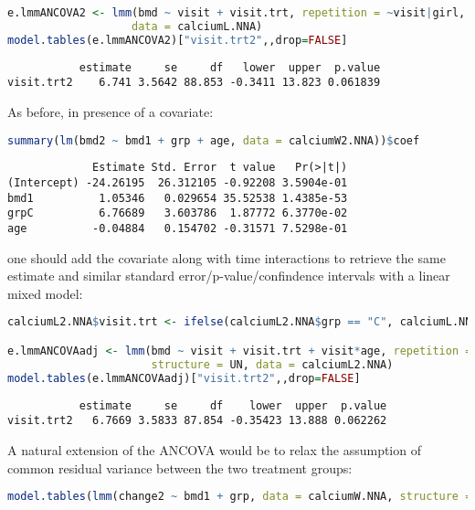 \documentclass[12pt]{article}
\begin{document}
\begin{lstlisting}[language=r,numbers=none]
e.lmmANCOVA2 <- lmm(bmd ~ visit + visit.trt, repetition = ~visit|girl, structure = UN,
                   data = calciumL.NNA)
model.tables(e.lmmANCOVA2)["visit.trt2",,drop=FALSE]
\end{lstlisting}

\label{}
\begin{verbatim}
           estimate     se     df   lower  upper  p.value
visit.trt2    6.741 3.5642 88.853 -0.3411 13.823 0.061839
\end{verbatim}


As before, in presence of a covariate:
\begin{lstlisting}[language=r,numbers=none]
summary(lm(bmd2 ~ bmd1 + grp + age, data = calciumW2.NNA))$coef
\end{lstlisting}

\label{}
\begin{verbatim}
             Estimate Std. Error  t value   Pr(>|t|)
(Intercept) -24.26195  26.312105 -0.92208 3.5904e-01
bmd1          1.05346   0.029654 35.52538 1.4385e-53
grpC          6.76689   3.603786  1.87772 6.3770e-02
age          -0.04884   0.154702 -0.31571 7.5298e-01
\end{verbatim}


one should add the covariate along with time interactions to retrieve
the same estimate and similar standard error/p-value/confindence
intervals with a linear mixed model:
\begin{lstlisting}[language=r,numbers=none]
calciumL2.NNA$visit.trt <- ifelse(calciumL2.NNA$grp == "C", calciumL.NNA$visit, "1")

e.lmmANCOVAadj <- lmm(bmd ~ visit + visit.trt + visit*age, repetition = ~visit|girl,
                      structure = UN, data = calciumL2.NNA)
model.tables(e.lmmANCOVAadj)["visit.trt2",,drop=FALSE]
\end{lstlisting}

\label{}
\begin{verbatim}
           estimate     se     df    lower  upper  p.value
visit.trt2   6.7669 3.5833 87.854 -0.35423 13.888 0.062262
\end{verbatim}


\clearpage


\noindent A natural extension of the ANCOVA would be to relax the
assumption of common residual variance between the two treatment
groups:
\begin{lstlisting}[language=r,numbers=none]
model.tables(lmm(change2 ~ bmd1 + grp, data = calciumW.NNA, structure = IND(~grp)))
\end{lstlisting}
\end{document}
